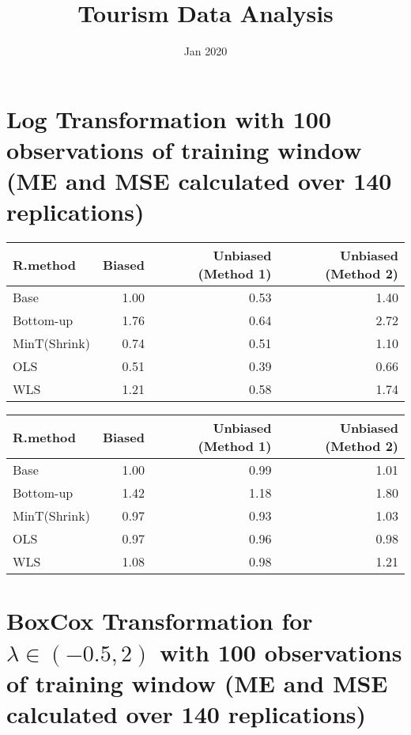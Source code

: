 \documentclass[
]{article}
\title{Tourism Data Analysis}
\author{}
\date{\vspace{-2.5em}Jan 2020}
\begin{document}
\maketitle

\hypertarget{log-transformation-with-100-observations-of-training-window-me-and-mse-calculated-over-140-replications}{%
\section{Log Transformation with 100 observations of training window (ME
and MSE calculated over 140
replications)}\label{log-transformation-with-100-observations-of-training-window-me-and-mse-calculated-over-140-replications}}

\begin{tabular}{l|r|r|r}
\hline
R.method & Biased & Unbiased (Method 1) & Unbiased (Method 2)\\
\hline
Base & 1.00 & 0.53 & 1.40\\
\hline
Bottom-up & 1.76 & 0.64 & 2.72\\
\hline
MinT(Shrink) & 0.74 & 0.51 & 1.10\\
\hline
OLS & 0.51 & 0.39 & 0.66\\
\hline
WLS & 1.21 & 0.58 & 1.74\\
\hline
\end{tabular}

\begin{tabular}{l|r|r|r}
\hline
R.method & Biased & Unbiased (Method 1) & Unbiased (Method 2)\\
\hline
Base & 1.00 & 0.99 & 1.01\\
\hline
Bottom-up & 1.42 & 1.18 & 1.80\\
\hline
MinT(Shrink) & 0.97 & 0.93 & 1.03\\
\hline
OLS & 0.97 & 0.96 & 0.98\\
\hline
WLS & 1.08 & 0.98 & 1.21\\
\hline
\end{tabular}

\hypertarget{boxcox-transformation-for-lambda-in--0.52-with-100-observations-of-training-window-me-and-mse-calculated-over-140-replications}{%
\section{\texorpdfstring{BoxCox Transformation for
\(\lambda \in (-0.5,2)\) with 100 observations of training window (ME
and MSE calculated over 140
replications)}{BoxCox Transformation for \textbackslash lambda \textbackslash in (-0.5,2) with 100 observations of training window (ME and MSE calculated over 140 replications)}}\label{boxcox-transformation-for-lambda-in--0.52-with-100-observations-of-training-window-me-and-mse-calculated-over-140-replications}}
\end{document}
